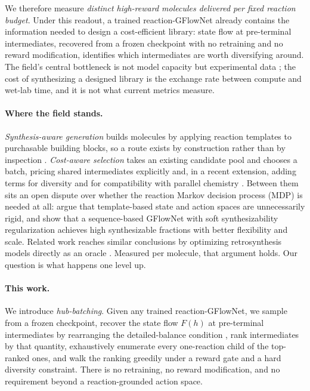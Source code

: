 \documentclass{article}
\begin{document}
We therefore measure \emph{distinct high-reward molecules delivered per fixed reaction budget}. Under this readout, a trained reaction-GFlowNet already contains the information needed to design a cost-efficient library: state flow at pre-terminal intermediates, recovered from a frozen checkpoint with no retraining and no reward modification, identifies which intermediates are worth diversifying around.
The field's central bottleneck is not model capacity but experimental data \citep{abolhasani2023sdl,tom2024sdl}; the cost of synthesizing a designed library is the exchange rate between compute and wet-lab time, and it is not what current metrics measure.

\paragraph{Where the field stands.}
\emph{Synthesis-aware generation} builds molecules by applying reaction templates to
purchasable building blocks, so a route exists by construction rather than by inspection \citep{koziarski2024rgfn,cretu2025synflownet,seo2024rxnflow,gainski2026scent,gao2025synformer}. \emph{Cost-aware selection} takes an existing candidate pool and chooses a batch, pricing shared intermediates explicitly \citep{fromer2024sparrow} and, in a recent extension,
adding terms for diversity and for compatibility with parallel chemistry
\citep{fromer2025diversity}. Between them sits an open dispute over whether the reaction Markov decision process (MDP) is needed at all: \citet{kim2026s3gfn} argue that template-based state and action spaces are unnecessarily rigid, and show that a sequence-based GFlowNet with soft synthesizability regularization achieves high synthesizable fractions with better flexibility and scale. Related work reaches similar conclusions by optimizing retrosynthesis models directly as an oracle \citep{guo2024saturn,guo2026tango}. Measured per molecule, that argument holds. Our question is what happens one level up.

\paragraph{This work.}
We introduce \emph{hub-batching}. Given any trained reaction-GFlowNet, we sample from a
frozen checkpoint, recover the state flow $F(h)$ at pre-terminal intermediates by
rearranging the detailed-balance condition
\citep{bengio2023gflownetfoundations,malkin2022trajectorybalance}, rank intermediates by that quantity, exhaustively enumerate every one-reaction child of the top-ranked ones, and walk the ranking greedily under a reward gate and a hard diversity constraint. There is no retraining, no reward modification, and no requirement beyond a reaction-grounded action space.
\end{document}
